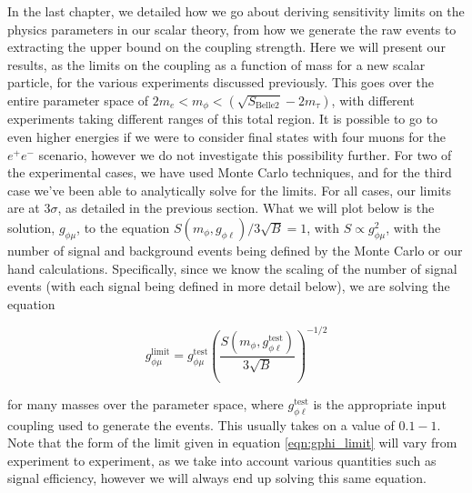\label{chapter:results}

In the last chapter, we detailed how we go about deriving sensitivity limits on the physics parameters in our scalar theory, from how we generate the raw events to extracting the upper bound on the coupling strength.
Here we will present our results, as the limits on the coupling as a function of mass for a new scalar particle, for the various experiments discussed previously.
This goes over the entire parameter space of $2m_e < m_\phi < (\sqrt{S_\textrm{Belle2}} - 2m_\tau)$, with different experiments taking different ranges of this total region.
It is possible to go to even higher energies if we were to consider final states with four muons for the $e^+ e^-$ scenario, however we do not investigate this possibility further.
For two of the experimental cases, we have used \madgraph Monte Carlo techniques, and for the third case we've been able to analytically solve for the limits.
For all cases, our limits are at $3\sigma$, as detailed in the previous section.
What we will plot below is the solution, $g_{\phi\mu}$, to the equation $S(m_\phi,g_{\phi\ell})/3\sqrt{B} = 1$, with $S \propto g_{\phi\mu}^2$, with the number of signal and background events being defined by the Monte Carlo or our hand calculations.
Specifically, since we know the scaling of the number of signal events (with each signal being defined in more detail below), we are solving the equation

\begin{equation}
\label{eqn:gphi_limit}
g_{\phi\mu}^\textrm{limit} = g_{\phi\mu}^\textrm{test} \left( \frac{S(m_\phi,g_{\phi\ell}^\textrm{test})}{3\sqrt{B}} \right)^{-1/2}
\end{equation}

\noindent for many masses over the parameter space, where $g_{\phi\ell}^\textrm{test}$ is the appropriate input coupling used to generate the events.
This usually takes on a value of $0.1 - 1$.
Note that the form of the limit given in equation \ref{eqn:gphi_limit} will vary from experiment to experiment, as we take into account various quantities such as signal efficiency, however we will always end up solving this same equation.




